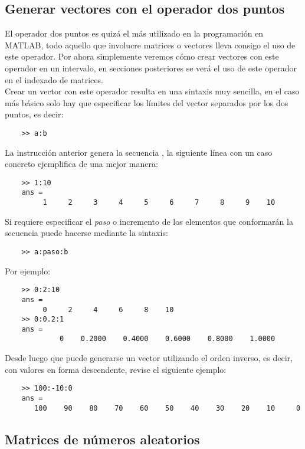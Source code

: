 \subsection{Generar vectores con el operador dos puntos}

El operador dos puntos es quizá el más utilizado  en la programación en MATLAB, todo aquello que 
involucre matrices o vectores lleva consigo el uso de este operador. Por ahora simplemente veremos 
cómo crear vectores con este operador en un intervalo, en secciones posteriores se verá el uso de 
este operador en el indexado de matrices.\\

Crear un vector con este operador resulta en una sintaxis muy sencilla, en el caso más básico solo 
hay que especificar los límites del vector separados por los dos puntos, es decir:

\begin{verbatim}
	>> a:b 
\end{verbatim}

La instrucción anterior genera la secuencia  , la siguiente línea con un caso concreto ejemplifica 
de una mejor manera:

\begin{verbatim}
	>> 1:10
	ans =
	     1     2     3     4     5     6     7     8     9    10
\end{verbatim}

Si requiere especificar el \textit{paso} o incremento de los elementos que conformarán la secuencia 
puede hacerse mediante la sintaxis:

\begin{verbatim}
	>> a:paso:b
\end{verbatim}

Por ejemplo:

\begin{verbatim}
	>> 0:2:10
	ans =
	     0     2     4     6     8    10
	>> 0:0.2:1
	ans =
	         0    0.2000    0.4000    0.6000    0.8000    1.0000
\end{verbatim}

Desde luego que puede generarse un vector utilizando el orden inverso, es decir, con valores en forma 
descendente, revise el siguiente ejemplo:

\begin{verbatim}
	>> 100:-10:0
	ans =
	   100    90    80    70    60    50    40    30    20    10     0
\end{verbatim}

\subsection{Matrices de números aleatorios}

